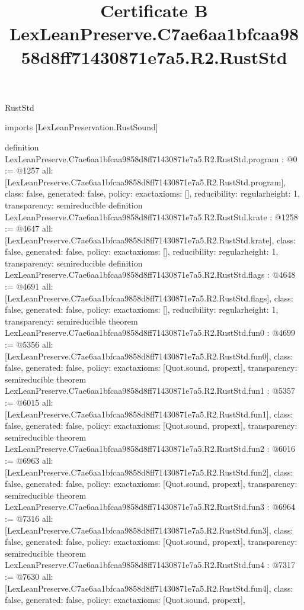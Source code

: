 \begin{lexlean}{RustStd}
\title{Certificate B LexLeanPreserve.C7ae6aa1bfcaa9858d8ff71430871e7a5.R2.RustStd}
\begin{coremodule}
imports [LexLeanPreservation.RustSound]

definition LexLeanPreserve.C7ae6aa1bfcaa9858d8ff71430871e7a5.R2.RustStd.program : @0 := @1257 {
  all: [LexLeanPreserve.C7ae6aa1bfcaa9858d8ff71430871e7a5.R2.RustStd.program],
  class: false,
  generated: false,
  policy: exact{axioms: []},
  reducibility: regular{height: 1},
  transparency: semireducible
}
definition LexLeanPreserve.C7ae6aa1bfcaa9858d8ff71430871e7a5.R2.RustStd.krate : @1258 := @4647 {
  all: [LexLeanPreserve.C7ae6aa1bfcaa9858d8ff71430871e7a5.R2.RustStd.krate],
  class: false,
  generated: false,
  policy: exact{axioms: []},
  reducibility: regular{height: 1},
  transparency: semireducible
}
definition LexLeanPreserve.C7ae6aa1bfcaa9858d8ff71430871e7a5.R2.RustStd.flags : @4648 := @4691 {
  all: [LexLeanPreserve.C7ae6aa1bfcaa9858d8ff71430871e7a5.R2.RustStd.flags],
  class: false,
  generated: false,
  policy: exact{axioms: []},
  reducibility: regular{height: 1},
  transparency: semireducible
}
theorem LexLeanPreserve.C7ae6aa1bfcaa9858d8ff71430871e7a5.R2.RustStd.fun0 : @4699 := @5356 {
  all: [LexLeanPreserve.C7ae6aa1bfcaa9858d8ff71430871e7a5.R2.RustStd.fun0],
  class: false,
  generated: false,
  policy: exact{axioms: [Quot.sound, propext]},
  transparency: semireducible
}
theorem LexLeanPreserve.C7ae6aa1bfcaa9858d8ff71430871e7a5.R2.RustStd.fun1 : @5357 := @6015 {
  all: [LexLeanPreserve.C7ae6aa1bfcaa9858d8ff71430871e7a5.R2.RustStd.fun1],
  class: false,
  generated: false,
  policy: exact{axioms: [Quot.sound, propext]},
  transparency: semireducible
}
theorem LexLeanPreserve.C7ae6aa1bfcaa9858d8ff71430871e7a5.R2.RustStd.fun2 : @6016 := @6963 {
  all: [LexLeanPreserve.C7ae6aa1bfcaa9858d8ff71430871e7a5.R2.RustStd.fun2],
  class: false,
  generated: false,
  policy: exact{axioms: [Quot.sound, propext]},
  transparency: semireducible
}
theorem LexLeanPreserve.C7ae6aa1bfcaa9858d8ff71430871e7a5.R2.RustStd.fun3 : @6964 := @7316 {
  all: [LexLeanPreserve.C7ae6aa1bfcaa9858d8ff71430871e7a5.R2.RustStd.fun3],
  class: false,
  generated: false,
  policy: exact{axioms: [Quot.sound, propext]},
  transparency: semireducible
}
theorem LexLeanPreserve.C7ae6aa1bfcaa9858d8ff71430871e7a5.R2.RustStd.fun4 : @7317 := @7630 {
  all: [LexLeanPreserve.C7ae6aa1bfcaa9858d8ff71430871e7a5.R2.RustStd.fun4],
  class: false,
  generated: false,
  policy: exact{axioms: [Quot.sound, propext]},
}
\end{coremodule}
\end{lexlean}
